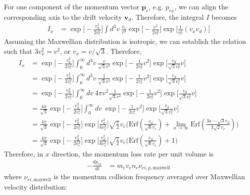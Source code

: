 \documentclass{article}
\begin{document}
For one component of the momentum vector $\bm{p}_e$, e.g. $p_{ex}$, we can align the corresponding axis to the drift velocity $\bm{v}_d$. Therefore, the integral $I$ becomes
\begin{equation}
	\begin{split}
		I_x &=\exp\Big[-\frac{v_d^2}{2v_e^2} \Big] \int d^3v\ \frac{v_x}{v^3} \exp\Big[-\frac{v^2}{2v_e^2} \Big] \exp\Big[\frac{1}{v_e^2}(v_x v_d ) \Big]
	\end{split}
\end{equation}
Assuming the Maxwellian distribution is isotropic, we can establish the relation such that $3v_x^2 = v^2$, or $v_x = v/ \sqrt{3}$. Therefore,
\begin{equation}
	\begin{split}
		I_x &= \exp\Big[-\frac{v_d^2}{2v_e^2} \Big] \int_0^\infty d^3v\ \frac{v}{\sqrt{3} v^3} \exp\Big[-\frac{1}{2v_e^2}v^2 \Big] \exp\Big[\frac{v_d}{\sqrt{3} v_e^2}v \Big] \\
		&= \exp\Big[-\frac{v_d^2}{2v_e^2} \Big] \int_0^\infty d^3v\ \frac{1}{\sqrt{3} v^2} \exp\Big[-\frac{1}{2v_e^2}v^2 \Big] \exp\Big[\frac{v_d}{\sqrt{3} v_e^2}v \Big] \\
		&= \exp\Big[-\frac{v_d^2}{2v_e^2} \Big] \int_0^\infty dv\ 4\pi v^2 \frac{1}{\sqrt{3} v^2} \exp\Big[-\frac{1}{2v_e^2}v^2 \Big] \exp\Big[\frac{v_d}{\sqrt{3} v_e^2}v \Big] \\
		&= \frac{4\pi}{\sqrt{3}} \exp\Big[-\frac{v_d^2}{2v_e^2} \Big] \int_0^\infty dv\ \exp\Big[-\frac{1}{2v_e^2}v^2 \Big] \exp\Big[\frac{v_d}{\sqrt{3} v_e^2}v \Big] \\
		&= \frac{4\pi}{\sqrt{3}} \exp\Big[-\frac{v_d^2}{2v_e^2} \Big] \exp\Big[\frac{v_d^2}{6v_e^2} \Big]\sqrt{\frac{\pi}{2}}v_e \Big(\text{Erf}(\frac{v_d}{\sqrt{6}v_e} ) + \lim_{a\to \infty} \text{Erf}(\frac{3a - \sqrt{3}v_d}{3\sqrt{2}v_e} )  \Big) \\
		&= \frac{4\pi}{\sqrt{3}} \exp\Big[-\frac{v_d^2}{2v_e^2} \Big] \exp\Big[\frac{v_d^2}{6v_e^2} \Big]\sqrt{\frac{\pi}{2}}v_e \Big(\text{Erf}(\frac{v_d}{\sqrt{6}v_e} ) + 1 \Big)
	\end{split}
\end{equation}
Therefore, in $x$ direction, the momentum loss rate per unit volume is
\begin{equation}
	\begin{split}
		-\frac{d p_{ex}}{d t} &= m_e v_e n_e \nu_{ei,p,\text{maxwell}}
	\end{split}
\end{equation}
where $\nu_{ei,\text{maxwell}}$ is the momentum collision frequency averaged over Maxwellian velocity distribution:
\end{document}
